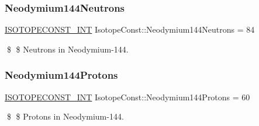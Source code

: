 \subsubsection{\texorpdfstring{Neodymium144\+Neutrons}{Neodymium144Neutrons}}
{\footnotesize\ttfamily \mbox{\hyperlink{group___isotope_const-_macros_ga5f18360b3e99483a35c32d789e62621c}{I\+S\+O\+T\+O\+P\+E\+C\+O\+N\+S\+T\+\_\+\+I\+NT}} Isotope\+Const\+::\+Neodymium144\+Neutrons = 84}

\$ \$ Neutrons in Neodymium-\/144. \mbox{\label{group___isotope_const-_neodymium-_nd144_gaccbb119f8b077cd55ed59323045ad7eb}} 
\subsubsection{\texorpdfstring{Neodymium144\+Protons}{Neodymium144Protons}}
{\footnotesize\ttfamily \mbox{\hyperlink{group___isotope_const-_macros_ga5f18360b3e99483a35c32d789e62621c}{I\+S\+O\+T\+O\+P\+E\+C\+O\+N\+S\+T\+\_\+\+I\+NT}} Isotope\+Const\+::\+Neodymium144\+Protons = 60}

\$ \$ Protons in Neodymium-\/144. 
